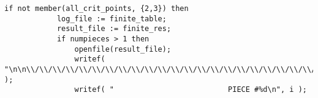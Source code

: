 \documentclass[a4paper,10pt]{article}
\begin{document}
\begin{lstlisting}[name=main]
        if not member(all_crit_points, {2,3}) then
            log_file := finite_table;
            result_file := finite_res;
            if numpieces > 1 then
                openfile(result_file);
                writef( "\n\n\\/\\/\\/\\/\\/\\/\\/\\/\\/\\/\\/\\/\\/\\/\\/\\/\\/\\/\\/\\/\\/\\/\\/\\/\\/\\/\\/\\/\\/\\/\\/\\/\\/\\/\\/\\/\\/\\/\\/\\/\n" );
                writef( "                          PIECE #%d\n", i );

\end{lstlisting}
\end{document}
